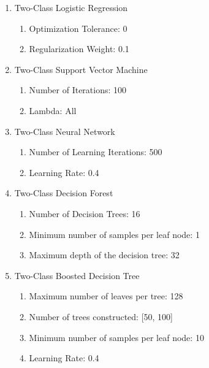 \begin{enumerate}
    \item{Two-Class Logistic Regression}
    
    \begin{enumerate}
        \item{Optimization Tolerance:} 0
        \item{Regularization Weight:} 0.1
    \end{enumerate}
    
    \item{Two-Class Support Vector Machine}
    
    \begin{enumerate}
        \item{Number of Iterations:} 100
        \item{Lambda:} All
    \end{enumerate}
    
    \item{Two-Class Neural Network}
    
    \begin{enumerate}
        \item{Number of Learning Iterations:} 500
        \item{Learning Rate:} 0.4
    \end{enumerate}
    
    \item{Two-Class Decision Forest}

    \begin{enumerate}
        \item{Number of Decision Trees:} 16
        \item{Minimum number of samples per leaf node:} 1
        \item{Maximum depth of the decision tree:} 32
    \end{enumerate}
    
    \item{Two-Class Boosted Decision Tree}
    
    \begin{enumerate}
        \item{Maximum number of leaves per tree:} 128
        \item{Number of trees constructed:} [50, 100]
        \item{Minimum number of samples per leaf node:} 10
        \item{Learning Rate:} 0.4
    \end{enumerate}
    
\end{enumerate}


